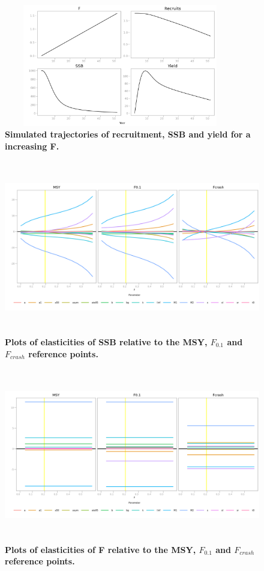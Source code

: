 \documentclass[10pt]{article}
\begin{document}
\begin{figure}[!ht]
\begin{center}
\includegraphics[height=2.1in, width=4in]{fig3.png}
\end{center}
\caption{\bf{Simulated trajectories of recruitment, SSB and yield for a increasing F.}}
\label{fig:kobe}
\end{figure}


\begin{figure}[!ht]
\begin{center}
\includegraphics[height=3in, width=6in]{fig4a.png}
\end{center}
\caption{\bf{Plots of elasticities of SSB relative to the MSY, $F_{0.1}$ and $F_{crash}$ reference points.}}
\label{fig:elasssbAll}
\end{figure}


\begin{figure}[!ht]
\begin{center}
\includegraphics[height=3in, width=6in]{fig5a.png}
\end{center}
\caption{\bf{Plots of elasticities of F relative to the MSY, $F_{0.1}$ and $F_{crash}$ reference points.}}
\label{fig:elasfAll}
\end{figure}
\end{document}
